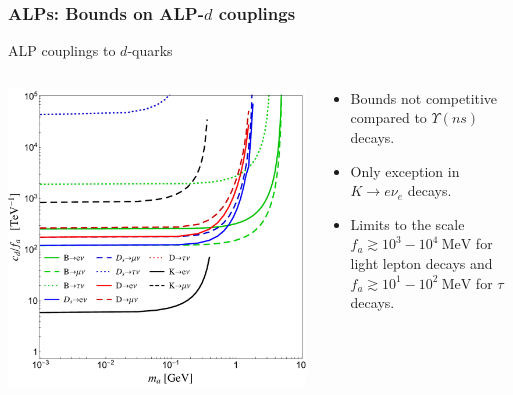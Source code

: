 \documentclass[mathserif, 10pt, dvipsnames]{beamer}
\begin{document}
\begin{frame}\frametitle{ALPs: Bounds on ALP-$d$ couplings}
    ALP couplings to $d$-quarks
    \begin{columns}
        \begin{column}{0.5\textwidth}
            \includegraphics[width=\columnwidth]{figures/Fig2bS}
        \end{column}
        \begin{column}{0.5\textwidth}
            \begin{itemize}
                \item Bounds not competitive compared to $\Upsilon(ns)$ decays.
                \item Only exception in $K\to e \nu_e$ decays.
                \item Limits to the scale $f_a \gtrsim 10^3- 10^4~\mathrm{MeV}$ for light lepton decays and $f_a \gtrsim 10^1 - 10^2~\mathrm{MeV}$ for $\tau$ decays.
            \end{itemize}
        \end{column}
    \end{columns}
\end{frame}
\end{document}
